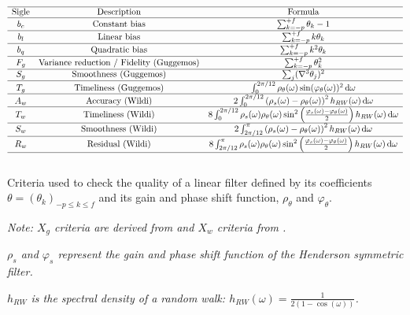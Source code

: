 \documentclass[
  12pt,
  ,
  a4paper]{article}
\newcommand\1{\mathds{1}}
\newcommand\ud{\,\mathrm{d}}
\begin{document}
\begin{table}[!ht]
$$\begin{array}{ccc}
\hline \text{Sigle} & \text{Description} & \text{Formula}\\
\hline b_{c} & \text{Constant bias} & \sum_{k=-p}^{+f}\theta_{k}-1\\
\hline b_{l} & \text{Linear bias} & \sum_{k=-p}^{+f}k\theta_{k}\\
\hline b_{q} & \text{Quadratic bias} & \sum_{k=-p}^{+f}k^{2}\theta_{k}\\
\hline F_{g} & \text{Variance reduction / Fidelity (Guggemos)} & \sum_{k=-p}^{+f}\theta_{k}^{2}\\
\hline S_{g} & \text{Smoothness (Guggemos)} & \sum_{j}(\nabla^{3}\theta_{j})^{2}\\
\hline T_{g} & \text{Timeliness (Guggemos)} & \int_{0}^{2\pi/12}\rho_{\theta}(\omega)\sin(\varphi_{\theta}(\omega))^{2}\ud\omega\\
\hline A_{w} & \text{Accuracy (Wildi)} & 2\int_0^{2\pi/12}\left(\rho_{s}(\omega)-\rho_{\theta}(\omega)\right)^{2}h_{RW}(\omega)\ud\omega\\
\hline T_{w} & \text{Timeliness (Wildi)} & 8\int_0^{2\pi/12} \rho_{s}(\omega)\rho_{\theta}(\omega)\sin^{2}\left(\frac{\varphi_s(\omega)-\varphi_\theta(\omega)}{2}\right)h_{RW}(\omega)\ud\omega\\
\hline S_{w} & \text{Smoothness (Wildi)} & 2\int_{2\pi/12}^{\pi}\left(\rho_{s}(\omega)-\rho_{\theta}(\omega)\right)^{2}h_{RW}(\omega)\ud\omega\\
\hline R_{w} & \text{Residual (Wildi)} & 8\int_{2\pi/12}^{\pi} \rho_{s}(\omega)\rho_{\theta}(\omega)\sin^{2}\left(\frac{\varphi_s(\omega)-\varphi_\theta(\omega)}{2}\right)h_{RW}(\omega)\ud\omega\\
\hline \\
\end{array} $$
\caption{Criteria used to check the quality of a linear filter defined by its coefficients $\theta=(\theta_k)_{-p\leq k\leq f}$ and its gain and phase shift function, $\rho_{\theta}$ and $\varphi_\theta$.} 
\label{tab:QC}
\footnotesize
\emph{Note: $X_g$ criteria are derived from \textcite{ch15HBSA} and $X_w$ criteria from \textcite{trilemmaWMR2019}.}

\emph{$\rho_s$ and $\varphi_s$ represent the gain and phase shift function of the Henderson symmetric filter.}

\emph{$h_{RW}$ is the spectral density of a random walk: $h_{RW}(\omega)=\frac{1}{2(1-\cos(\omega))}$.}
\end{table}
\end{document}
